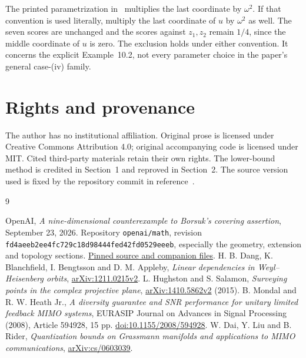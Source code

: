 \documentclass[11pt,a4paper]{article}
\theoremstyle{remark}
\numberwithin{equation}{section}
\begin{document}
The printed parametrization in~\cite[(7.1)]{HS} multiplies the last coordinate by $\omega^2$. If that convention is used literally, multiply the last coordinate of $u$ by $\omega^2$ as well. The seven scores are unchanged and the scores against $z_1,z_2$ remain $1/4$, since the middle coordinate of $u$ is zero. The exclusion holds under either convention. It concerns the explicit Example~10.2, not every parameter choice in the paper's general case-(iv) family.

\section*{Rights and provenance}
The author has no institutional affiliation. Original prose is licensed under Creative Commons Attribution 4.0; original accompanying code is licensed under MIT. Cited third-party materials retain their own rights. The lower-bound method is credited in Section~1 and reproved in Section~2. The source version used is fixed by the repository commit in reference~\cite{OpenAI}.

\begin{thebibliography}{9}
\raggedright
{}
OpenAI, \emph{A nine-dimensional counterexample to Borsuk's covering assertion}, September 23, 2026. Repository \texttt{openai/math}, revision \texttt{fd4aeeb2ee4fc729c18d98444fed42fd0529eeeb}, especially the geometry, extension and topology sections.\newline
\href{https://github.com/openai/math/tree/fd4aeeb2ee4fc729c18d98444fed42fd0529eeeb/preprints/A-nine-dimensional-counterexample-to-Borsuks-covering-assertion-September-23-2026}{Pinned source and companion files}.
H. B. Dang, K. Blanchfield, I. Bengtsson and D. M. Appleby,
\emph{Linear dependencies in Weyl--Heisenberg orbits},
\href{https://arxiv.org/abs/1211.0215v2}{arXiv:1211.0215v2}.
L. Hughston and S. Salamon,
\emph{Surveying points in the complex projective plane},
\href{https://arxiv.org/abs/1410.5862v2}{arXiv:1410.5862v2} (2015).
B. Mondal and R. W. Heath Jr.,
\emph{A diversity guarantee and SNR performance for unitary limited feedback MIMO systems},
EURASIP Journal on Advances in Signal Processing (2008), Article 594928, 15 pp.
\href{https://doi.org/10.1155/2008/594928}{doi:10.1155/2008/594928}.
W. Dai, Y. Liu and B. Rider,
\emph{Quantization bounds on Grassmann manifolds and applications to MIMO communications},
\href{https://arxiv.org/abs/cs/0603039}{arXiv:cs/0603039}.
\end{thebibliography}
\end{document}
